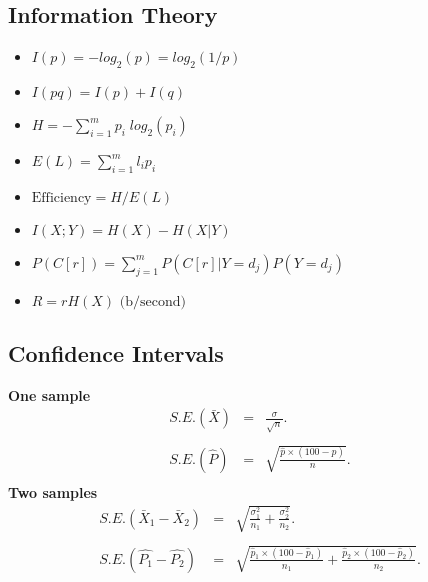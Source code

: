 \subsection*{Information Theory}

\begin{itemize}
\item $I(p) = - log_{2}(p) = log_{2}(1/p)$\\

\item $I(pq) = I(p) + I(q)$\\

\item $H = - \sum_{i=1}^{m}p_{i}\; log_{2}(p_{i})$\\

\item $E(L) = \sum_{i=1}^{m} l_{i} p_{i}$\\

\item $\mbox{Efficiency} = H / E(L)$\\

\item $I(X;Y) = H(X) - H(X|Y)$\\

\item $P(C[r]) = \sum_{j=1}^{m}P(C[r]|Y=d_{j} )P(Y=d_{j} )$

\item $R = rH(X) \mbox{      (b/second)}$
\end{itemize}

\newpage
\subsection*{Confidence Intervals}
{\bf One sample}
\begin{eqnarray*} S.E.(\bar{X})&=&\frac{\sigma}{\sqrt{n}}.\\\\
S.E.(\hat{P})&=&\sqrt{\frac{\hat{p}\times(100-\hat{p})}{n}}.\\
\end{eqnarray*}
{\bf Two samples}
\begin{eqnarray*}
S.E.(\bar{X}_1-\bar{X}_2)&=&\sqrt{\frac{\sigma^2_1}{n_1}+\frac{\sigma_2^2}{n_2}}.\\\\
S.E.(\hat{P_1}-\hat{P_2})&=&\sqrt{\frac{\hat{p}_1\times(100-\hat{p}_1)}{n_1}+\frac{\hat{p}_2\times(100-\hat{p}_2)}{n_2}}.\\\\
\end{eqnarray*}
